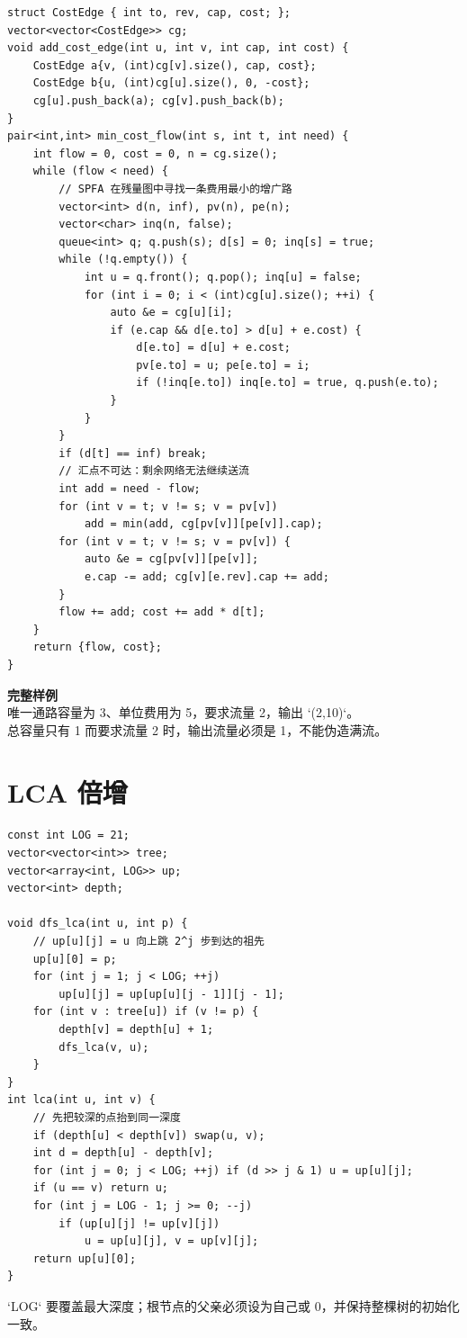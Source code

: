 \begin{lstlisting}[style=cpp]
struct CostEdge { int to, rev, cap, cost; };
vector<vector<CostEdge>> cg;
void add_cost_edge(int u, int v, int cap, int cost) {
    CostEdge a{v, (int)cg[v].size(), cap, cost};
    CostEdge b{u, (int)cg[u].size(), 0, -cost};
    cg[u].push_back(a); cg[v].push_back(b);
}
pair<int,int> min_cost_flow(int s, int t, int need) {
    int flow = 0, cost = 0, n = cg.size();
    while (flow < need) {
        // SPFA 在残量图中寻找一条费用最小的增广路
        vector<int> d(n, inf), pv(n), pe(n);
        vector<char> inq(n, false);
        queue<int> q; q.push(s); d[s] = 0; inq[s] = true;
        while (!q.empty()) {
            int u = q.front(); q.pop(); inq[u] = false;
            for (int i = 0; i < (int)cg[u].size(); ++i) {
                auto &e = cg[u][i];
                if (e.cap && d[e.to] > d[u] + e.cost) {
                    d[e.to] = d[u] + e.cost;
                    pv[e.to] = u; pe[e.to] = i;
                    if (!inq[e.to]) inq[e.to] = true, q.push(e.to);
                }
            }
        }
        if (d[t] == inf) break;
        // 汇点不可达：剩余网络无法继续送流
        int add = need - flow;
        for (int v = t; v != s; v = pv[v])
            add = min(add, cg[pv[v]][pe[v]].cap);
        for (int v = t; v != s; v = pv[v]) {
            auto &e = cg[pv[v]][pe[v]];
            e.cap -= add; cg[v][e.rev].cap += add;
        }
        flow += add; cost += add * d[t];
    }
    return {flow, cost};
}
\end{lstlisting}

\begin{card}
\textbf{完整样例}\\
唯一通路容量为 3、单位费用为 5，要求流量 2，输出 `(2,10)`。\\
总容量只有 1 而要求流量 2 时，输出流量必须是 1，不能伪造满流。
\end{card}

\section{LCA 倍增}


\begin{lstlisting}[style=cpp]
const int LOG = 21;
vector<vector<int>> tree;
vector<array<int, LOG>> up;
vector<int> depth;

void dfs_lca(int u, int p) {
    // up[u][j] = u 向上跳 2^j 步到达的祖先
    up[u][0] = p;
    for (int j = 1; j < LOG; ++j)
        up[u][j] = up[up[u][j - 1]][j - 1];
    for (int v : tree[u]) if (v != p) {
        depth[v] = depth[u] + 1;
        dfs_lca(v, u);
    }
}
int lca(int u, int v) {
    // 先把较深的点抬到同一深度
    if (depth[u] < depth[v]) swap(u, v);
    int d = depth[u] - depth[v];
    for (int j = 0; j < LOG; ++j) if (d >> j & 1) u = up[u][j];
    if (u == v) return u;
    for (int j = LOG - 1; j >= 0; --j)
        if (up[u][j] != up[v][j])
            u = up[u][j], v = up[v][j];
    return up[u][0];
}
\end{lstlisting}

\begin{warnbox}
`LOG` 要覆盖最大深度；根节点的父亲必须设为自己或 0，并保持整棵树的初始化一致。
\end{warnbox}
